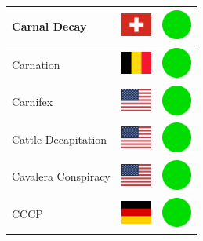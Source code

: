 \documentclass[12pt, a4paper, twoside]{report}
\begin{document}
\begin{center}
\begin{longtable}{|p{5cm}|p{2cm}|p{2cm}|}
 Carnal Decay                                               & \includegraphics[width=1cm]{../4x3/ch} &   \includegraphics[width=1cm]{../likes/y} \\ \hline
 Carnation                                                  & \includegraphics[width=1cm]{../4x3/be} &   \includegraphics[width=1cm]{../likes/y} \\ \hline
 Carnifex                                                   & \includegraphics[width=1cm]{../4x3/us} &   \includegraphics[width=1cm]{../likes/y} \\ \hline
 Cattle Decapitation                                        & \includegraphics[width=1cm]{../4x3/us} &   \includegraphics[width=1cm]{../likes/y} \\ \hline
 Cavalera Conspiracy                                        & \includegraphics[width=1cm]{../4x3/us} &   \includegraphics[width=1cm]{../likes/y} \\ \hline
 CCCP                                                       & \includegraphics[width=1cm]{../4x3/de} &   \includegraphics[width=1cm]{../likes/y} \\ \hline

\end{longtable}
\end{center}
\end{document}
